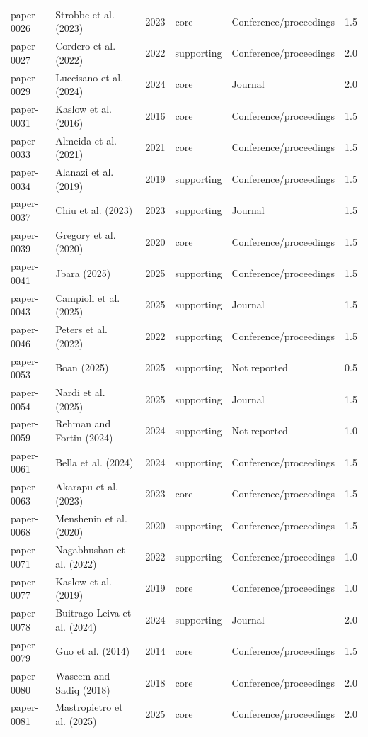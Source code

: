 \documentclass[10pt]{article}
\begin{document}
\begin{longtable}{p{1.7cm}p{4.0cm}p{1.1cm}p{1.6cm}p{4.0cm}p{1.2cm}}
paper-0026 & Strobbe et al. (2023) & 2023 & core & Conference/proceedings & 1.5 \\
paper-0027 & Cordero et al. (2022) & 2022 & supporting & Conference/proceedings & 2.0 \\
paper-0029 & Luccisano et al. (2024) & 2024 & core & Journal & 2.0 \\
paper-0031 & Kaslow et al. (2016) & 2016 & core & Conference/proceedings & 1.5 \\
paper-0033 & Almeida et al. (2021) & 2021 & core & Conference/proceedings & 1.5 \\
paper-0034 & Alanazi et al. (2019) & 2019 & supporting & Conference/proceedings & 1.5 \\
paper-0037 & Chiu et al. (2023) & 2023 & supporting & Journal & 1.5 \\
paper-0039 & Gregory et al. (2020) & 2020 & core & Conference/proceedings & 1.5 \\
paper-0041 & Jbara (2025) & 2025 & supporting & Conference/proceedings & 1.5 \\
paper-0043 & Campioli et al. (2025) & 2025 & supporting & Journal & 1.5 \\
paper-0046 & Peters et al. (2022) & 2022 & supporting & Conference/proceedings & 1.5 \\
paper-0053 & Boan (2025) & 2025 & supporting & Not reported & 0.5 \\
paper-0054 & Nardi et al. (2025) & 2025 & supporting & Journal & 1.5 \\
paper-0059 & Rehman and Fortin (2024) & 2024 & supporting & Not reported & 1.0 \\
paper-0061 & Bella et al. (2024) & 2024 & supporting & Conference/proceedings & 1.5 \\
paper-0063 & Akarapu et al. (2023) & 2023 & core & Conference/proceedings & 1.5 \\
paper-0068 & Menshenin et al. (2020) & 2020 & supporting & Conference/proceedings & 1.5 \\
paper-0071 & Nagabhushan et al. (2022) & 2022 & supporting & Conference/proceedings & 1.0 \\
paper-0077 & Kaslow et al. (2019) & 2019 & core & Conference/proceedings & 1.0 \\
paper-0078 & Buitrago-Leiva et al. (2024) & 2024 & supporting & Journal & 2.0 \\
paper-0079 & Guo et al. (2014) & 2014 & core & Conference/proceedings & 1.5 \\
paper-0080 & Waseem and Sadiq (2018) & 2018 & core & Conference/proceedings & 2.0 \\
paper-0081 & Mastropietro et al. (2025) & 2025 & core & Conference/proceedings & 2.0 \\
\bottomrule
\end{longtable}
\normalsize
\end{document}
